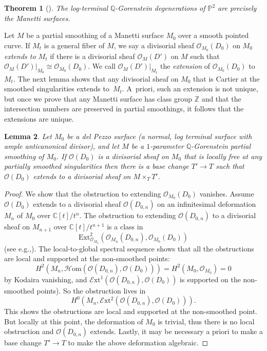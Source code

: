 \documentclass[11pt]{article}
\newcommand{\eg}{e.g.,\xspace}
\theoremstyle{plain}
\newtheorem{theorem}{Theorem}[section]
\newtheorem{lemma}[theorem]{Lemma}
\theoremstyle{definition}
\newcommand\CC{{\mathbb C}}
\newcommand\PP{{\mathbb{P}}}
\newcommand\QQ{{\mathbb Q}}
\newcommand\ZZ{{\mathbb Z}}
\newcommand\Oc{{\mathcal O}}
\newcommand\Ext{{\mathrm{Ext}}}
\begin{document}
\begin{theorem}[{\cite[Cor.\,1.2]{HackProk}}]\label{thm:manettisurfaces}
The log-terminal $\QQ$-Gorenstein degenerations of $\PP^2$ are precisely the Manetti surfaces.
\end{theorem}

Let $M$ be a partial smoothing of a Manetti surface $M_0$ over a smooth pointed curve. If $M_t$ is a general fiber of $M$, we say a divisorial sheaf $\Oc_{M_0}(D_0)$ on $M_0$ \textit{extends to $M_t$} if there is a divisorial sheaf $\Oc_{M}(D')$ on $M$ such that $\Oc_{M}(D')|_{M_0} \cong \Oc_{M_0}(D_0)$. We call $\Oc_{M}(D')|_{M_t}$ the \textit{extension} of $\Oc_{M_0}(D_0)$ to $M_t$. The next lemma shows that any divisorial sheaf on $M_0$ that is Cartier at the smoothed singularities extends to~$M_t$. A~priori, such an extension is not unique, but once we prove that any Manetti surface has class group $\ZZ$ and that the intersection numbers are preserved in partial smoothings, it follows that the extensions are unique.

\begin{lemma}\label{extendingdivisors}
Let $M_0$ be a del Pezzo surface (a normal, log terminal surface with ample anticanonical divisor), and let $M$ be a $1$-parameter $\QQ$-Gorenstein partial smoothing of $M_0$. If $\Oc(D_0)$ is a divisorial sheaf on $M_0$ that is locally free at any partially smoothed singularities then there is a base change $T'\to T$ such that $\Oc(D_0)$ extends to a divisorial sheaf on $M \times_T T'$.
\end{lemma}

\begin{proof}
We show that the obstruction to extending $\Oc_{M_0}(D_0)$ vanishes. Assume $\Oc(D_0)$ extends to a divisorial sheaf $\Oc(D_{0,n})$ on an infinitesimal deformation $M_n$ of $M_0$ over $\CC[t]/t^n$. The obstruction to extending $\Oc(D_{0,n})$ to a divisorial sheaf on $M_{n+1}$ over $\CC[t]/t^{n+1}$ is a class in
\[
\Ext^2_{\Oc_{M_n}}(\Oc_{M_n}(D_{0,n}),\Oc_{M_0}(D_0))
\]
(see \eg \cite[\href{https://stacks.math.columbia.edu/tag/08L8}{Tag 0ECH}]{stacks-project}). The local-to-global spectral sequence shows that all the obstructions are local and supported at the non-smoothed points: \[H^2(M_n,\mathcal{H}\mathrm{om}(\Oc(D_{0,n}),\Oc(D_0))) = H^2(M_0,\Oc_{M_0}) = 0\] by Kodaira vanishing, and $\mathcal{E}\mathrm{xt}^1(\Oc(D_{0,n}),\Oc(D_0))$ is supported on the non-smoothed points). So the obstruction lives in
\[
H^0(M_n,\mathcal{E}\mathrm{xt}^2(\Oc(D_{0,n}),\Oc(D_0))).
\]
This shows the obstructions are local and supported at the non-smoothed point. But locally at this point, the deformation of $M_0$ is trivial, thus there is no local obstruction and $\Oc(D_{0,n})$ extends. Lastly, it may be necessary a priori to make a base change $T'\to T$ to make the above deformation algebraic.
\end{proof}
\end{document}
